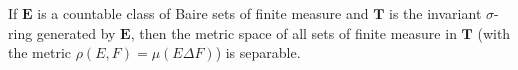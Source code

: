 If $\mathbf{E}$ is a countable class of Baire sets of finite measure and $\mathbf{T}$ is the invariant $\sigma$-ring generated by $\mathbf{E}$, then the metric space of all sets of finite measure in $\mathbf{T}$ (with the metric $\rho(E,F) = \mu(E \Delta F)$) is separable.